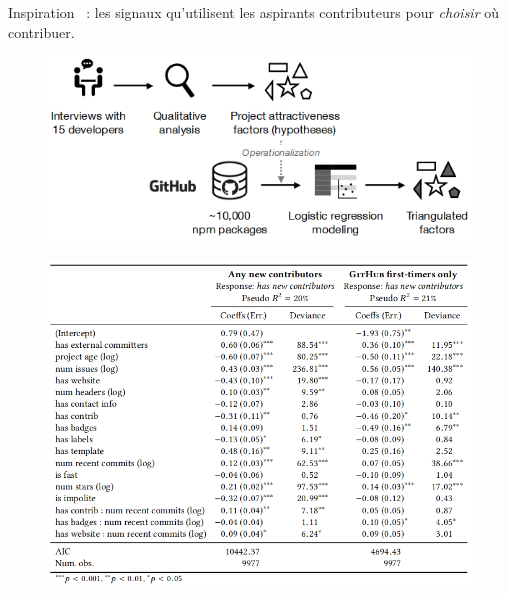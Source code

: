 \documentclass[usenames,dvipsnames,10pt]{beamer}
\newcommand{\mycite}[1]{%
    \citeauthor{#1} \citeyear{#1} \cite{#1}%
}
\begin{document}
\begin{frame}[fragile]{Inspiration}
    \mycite{signals-2019} : les signaux qu'utilisent les aspirants contributeurs
    pour \emph{choisir} où contribuer.

    \begin{minipage}{.49\textwidth}
        \begin{figure}
            \includegraphics[width=\textwidth]{qiu_overview}
        \end{figure}
    \end{minipage}
    \begin{minipage}{.49\textwidth}
        \begin{figure}
            \includegraphics[width=\textwidth]{qiu_regressions}
        \end{figure}
    \end{minipage}



\end{frame}
\end{document}
